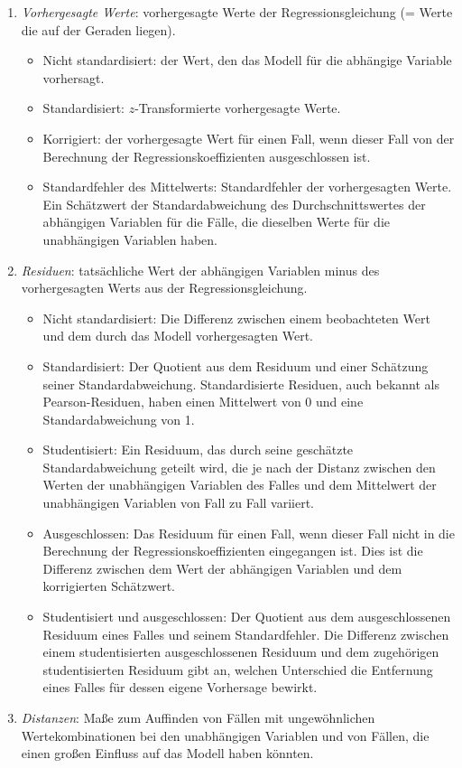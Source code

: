 \documentclass[]{article}
\providecommand{\tightlist}{%
  \setlength{\itemsep}{0pt}\setlength{\parskip}{0pt}}
\begin{document}
\begin{enumerate}
\def\labelenumi{\arabic{enumi}.}
\tightlist
\item
  \emph{Vorhergesagte Werte}: vorhergesagte Werte der
  Regressionsgleichung (= Werte die auf der Geraden liegen).

  \begin{itemize}
  \tightlist
  \item
    Nicht standardisiert: der Wert, den das Modell für die abhängige
    Variable vorhersagt.
  \item
    Standardisiert: \(z\)-Transformierte vorhergesagte Werte.
  \item
    Korrigiert: der vorhergesagte Wert für einen Fall, wenn dieser Fall
    von der Berechnung der Regressionskoeffizienten ausgeschlossen ist.
  \item
    Standardfehler des Mittelwerts: Standardfehler der vorhergesagten
    Werte. Ein Schätzwert der Standardabweichung des Durchschnittswertes
    der abhängigen Variablen für die Fälle, die dieselben Werte für die
    unabhängigen Variablen haben.
  \end{itemize}
\item
  \emph{Residuen}: tatsächliche Wert der abhängigen Variablen minus des
  vorhergesagten Werts aus der Regressionsgleichung.

  \begin{itemize}
  \tightlist
  \item
    Nicht standardisiert: Die Differenz zwischen einem beobachteten Wert
    und dem durch das Modell vorhergesagten Wert.
  \item
    Standardisiert: Der Quotient aus dem Residuum und einer Schätzung
    seiner Standardabweichung. Standardisierte Residuen, auch bekannt
    als Pearson-Residuen, haben einen Mittelwert von 0 und eine
    Standardabweichung von 1.
  \item
    Studentisiert: Ein Residuum, das durch seine geschätzte
    Standardabweichung geteilt wird, die je nach der Distanz zwischen
    den Werten der unabhängigen Variablen des Falles und dem Mittelwert
    der unabhängigen Variablen von Fall zu Fall variiert.
  \item
    Ausgeschlossen: Das Residuum für einen Fall, wenn dieser Fall nicht
    in die Berechnung der Regressionskoeffizienten eingegangen ist. Dies
    ist die Differenz zwischen dem Wert der abhängigen Variablen und dem
    korrigierten Schätzwert.
  \item
    Studentisiert und ausgeschlossen: Der Quotient aus dem
    ausgeschlossenen Residuum eines Falles und seinem Standardfehler.
    Die Differenz zwischen einem studentisierten ausgeschlossenen
    Residuum und dem zugehörigen studentisierten Residuum gibt an,
    welchen Unterschied die Entfernung eines Falles für dessen eigene
    Vorhersage bewirkt.
  \end{itemize}
\item
  \emph{Distanzen}: Maße zum Auffinden von Fällen mit ungewöhnlichen
  Wertekombinationen bei den unabhängigen Variablen und von Fällen, die
  einen großen Einfluss auf das Modell haben könnten.


\end{enumerate}
\end{document}
